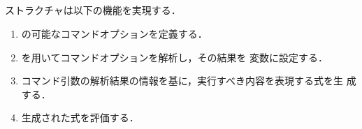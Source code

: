 \subsection{}
	ストラクチャは以下の機能を実現する．
\begin{enumerate}
\item \smlsharp{}の可能なコマンドオプションを定義する．
\item {}を用いてコマンドオプションを解析し，その結果を
変数に設定する．
\item コマンド引数の解析結果の情報を基に，実行すべき内容を表現する式を生
成する．
\item 生成された式を評価する．
\end{enumerate}

\fi%

